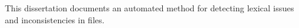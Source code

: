 This dissertation documents an automated method for detecting lexical
issues and inconsistencies in {\bibtex} files.